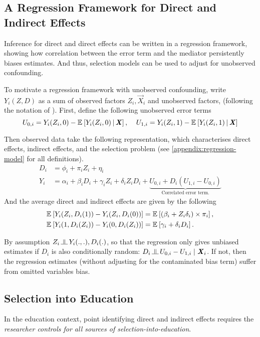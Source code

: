 \subsection{A Regression Framework for Direct and Indirect Effects}
Inference for direct and direct effects can be written in a regression framework, showing how correlation between the error term and the mediator persistently biases estimates.
And thus, selection models can be used to adjust for unobserved confounding.

To motivate a regression framework with unobserved confounding, write $Y_i(Z, D)$ as a sum of observed factors $Z_i, \vec X_i$ and unobserved factors, (following the notation of \citealt{heckman2005structural}).
First, define the following unobserved error terms
\[ U_{0,i} = Y_i(Z_i, 0) - \mathbb{E}_{} \left[ Y_i(Z_i, 0) \, \middle\vert \, \boldsymbol{\mathit{X}} \right],\;\;\;\;
U_{1,i} = Y_i(Z_i, 1) - \mathbb{E}_{} \left[ Y_i(Z_i, 1) \, \middle\vert \, \boldsymbol{\mathit{X}} \right] \]

Then observed data take the following representation, which characterises direct effects, indirect effects, and the selection problem (see \autoref{appendix:regression-model} for all definitions).
\begin{align*}
    D_i &= \phi_i + \pi_i Z_i + \eta_i  \\
    Y_i &= \alpha_i + \beta_i D_i + \gamma_i Z_i + \delta_i Z_i D_i
    + \underbrace{U_{0,i} + D_i \left( U_{1,i} - U_{0,i} \right)}_{
        \text{Correlated error term.}}
\end{align*}
And the average direct and indirect effects are given by the following
\begin{align*}
    \mathbb{E}_{} \left[ Y_i(Z_i, D_i(1)) - Y_i(Z_i, D_i(0)) \right]
        &= \mathbb{E}_{} \left[ \left( \beta_i +  Z_i \delta_i \right) \times \pi_i \right], \\
    \mathbb{E}_{} \left[ Y_i(1, D_i(Z_i)) - Y_i(0, D_i(Z_i)) \right]
        &= \mathbb{E}_{} \left[ \gamma_i + \delta_i D_i \right].
\end{align*}

By assumption $Z_i \indep Y_i(.,.), D_i(.)$, so that the regression only gives unbiased estimates if $D_i$ is also conditionally random: $D_i \indep U_{0, i} - U_{1, i} \; | \; \vec X_i$.
If not, then the regression estimates (without adjusting for the contaminated bias term) suffer from omitted variables bias.

\subsection{Selection into Education}
In the education context, point identifying direct and indirect effects requires the \textit{researcher controls for all sources of selection-into-education}.

